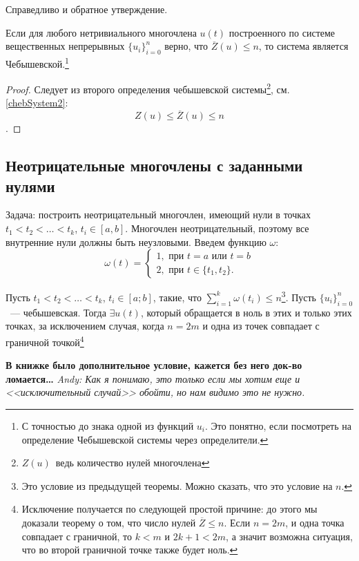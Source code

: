 Справедливо и обратное утверждение.

\begin{thm}
    Если для любого нетривиального многочлена $u(t)$ построенного по системе вещественных непрерывных $\{u_i\}_{i = 0}^n$
    верно, что $\overline{Z}(u) \leq n$, то система является Чебышевской.\footnote{С точностью до знака одной из функций $u_i$.
    Это понятно, если посмотреть на определение Чебышевской системы через определители.}
\end{thm}
\begin{proof}
Следует из второго определения чебышевской системы\footnote{$Z(u)$ ведь количество нулей многочлена}, см. \ref{chebSystem2}:
$$Z(u) \leq \overline{Z}(u) \leq n$$.
\end{proof}

\subsection{Неотрицательные многочлены с заданными нулями}
Задача: построить неотрицательный многочлен, имеющий нули в точках $t_1 < t_2 < … < t_k$, $t_i \in [a, b]$. Многочлен неотрицательный, поэтому все внутренние нули должны быть неузловыми. Введем функцию $\omega$:
$$ \omega(t) = \begin{cases}
    1, \text{ при }t = a \text{ или }t = b\\
    2, \text{ при }t \in \{t_1, t_2\}.
\end{cases}
$$
\begin{thm}
    Пусть $t_1 < t_2 <  … < t_k$, $t_i \in [a; b]$, такие, что $\sum \limits_{i=1}^{k} \omega(t_i) \leq n$\footnote{Это условие из предыдущей теоремы.
    Можно сказать, что это условие на $n$.}. Пусть $\{u_i\}_{i=0}^{n}$ — чебышевская. Тогда $\exists u(t)$, который обращается в ноль в этих и только этих точках, за исключением случая, когда $n=2m$ и одна из точек совпадает с граничной точкой\footnote{Исключение получается по следующей простой причине: до этого мы доказали теорему о том, что число нулей $\overline{Z} \leq n$. Если $n=2m$, и одна точка совпадает с граничной, то $k < m$ и $2k+1 < 2m$, а значит возможна ситуация, что во второй граничной точке также будет ноль.}
\end{thm}

\textbf{В книжке было дополнительное условие, кажется без него док-во ломается…}
\textit{Andy: Как я понимаю, это только если мы хотим еще и <<исключительный случай>> обойти, но нам видимо это не нужно.}

